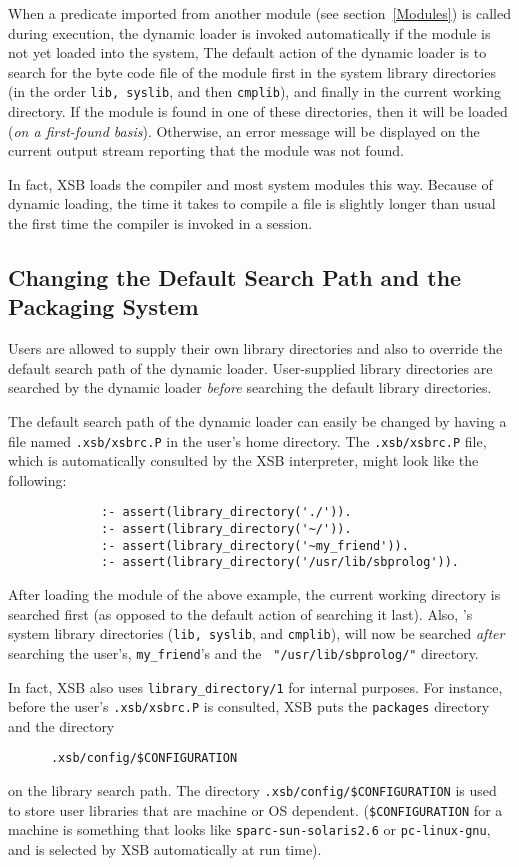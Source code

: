 When a predicate imported from another module (see section~\ref{Modules})
is called during execution, the dynamic loader is invoked automatically
if the module is not yet loaded into the system, 
The default action of the dynamic loader is to search for the
byte code file of the module 
first in the system library directories (in the order {\tt lib, syslib}, 
and then {\tt cmplib}), and finally in the current working directory.
If the module is found in one of these directories, then it will 
be loaded ({\em on a first-found basis}). Otherwise, an error 
message will be displayed on the current output stream
reporting that the module was not found.

In fact, XSB loads the compiler and most system modules this way.
Because of dynamic loading, the time it takes to compile a file 
is slightly longer than usual the first time the compiler is 
invoked in a session.


\subsection{Changing the Default Search Path and the Packaging System}
Users are allowed to supply their own library directories and also to
override the default search path of the dynamic loader. 
User-supplied library directories are searched by the dynamic loader 
{\em before} searching the default library directories.

The default search path of the dynamic loader can easily be changed
by having a file named {\verb|.xsb/xsbrc.P|} in the user's home directory.  
The {\verb|.xsb/xsbrc.P|} file, which is automatically consulted by the
 XSB interpreter, might look like the following:
\begin{verbatim}
             :- assert(library_directory('./')).
             :- assert(library_directory('~/')).
             :- assert(library_directory('~my_friend')).
             :- assert(library_directory('/usr/lib/sbprolog')).
\end{verbatim}
After loading the module of the above example, the current working
directory is searched first (as opposed to the default action of
searching it last).  Also, \ourprolog's system library directories
({\tt lib, syslib}, and {\tt cmplib}), will now be searched {\em
after} searching the user's, {\tt my\_friend}'s and the {\tt
"/usr/lib/sbprolog/"} directory.

 In fact, XSB also uses {\tt library\_directory/1} for internal purposes.
 For instance, before the user's {\verb|.xsb/xsbrc.P|} is consulted,
 XSB puts the {\tt packages} directory and the directory 
 \begin{verbatim}
      .xsb/config/$CONFIGURATION
 \end{verbatim}
 on the library search path.
 The directory \verb'.xsb/config/$CONFIGURATION' is used to store user
 libraries that are machine or OS dependent. (\verb'$CONFIGURATION' for a
 machine is something that looks like {\tt sparc-sun-solaris2.6} or
 {\tt pc-linux-gnu}, and is selected by XSB automatically at run time).  

